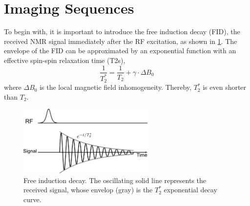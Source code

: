 \section{Imaging Sequences} \label{Sec:mri-seq}
To begin with, it is important to introduce the free induction decay (\acs{FID}), the received NMR signal immediately after the RF excitation, as shown in \cref{Fig:mri-fid}. The envelope of the FID can be approximated by an exponential function with an effective spin-spin relaxation time (\acs{T2s}), 
\begin{equation} \label{Equ:mri_t2s}
  \frac{1}{T_{2}^{*}} = \frac{1}{T_2} + \gamma \cdot \Delta B_0
\end{equation}
where $\Delta B_0$ is the local magnetic field inhomogeneity. Thereby, $T_{2}^{*}$ is even shorter than $T_2$.
\begin{figure}[tb]
  \centering
  \includegraphics[width=0.6\textwidth]{fig/mri-fid.png}
  \caption{Free induction decay. The oscillating solid line represents the received signal, whose envelop (gray) is the $T_{2}^{*}$ exponential decay curve.} \label{Fig:mri-fid}
\end{figure}

